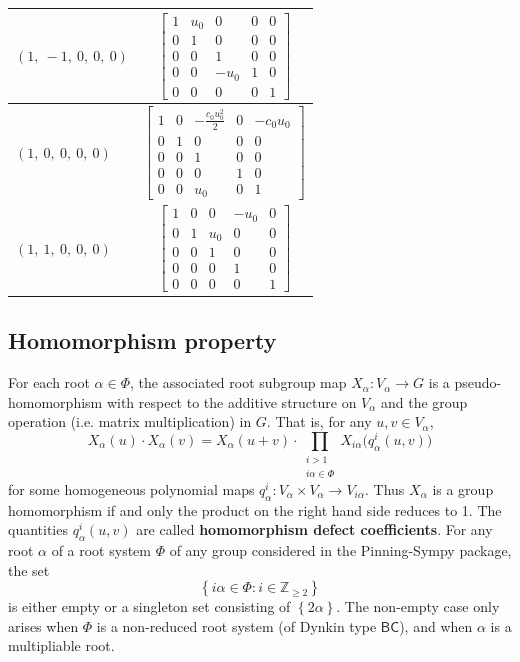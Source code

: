 \documentclass[11pt]{article}
\newcommand{\noi}{\noindent}
\newcommand{\tbf}{\textbf}
\newcommand{\lb}{\left\{}
\newcommand{\rb}{\right\}}
\newcommand{\Z}{\mathbb{Z}}
\theoremstyle{definition}
\begin{document}
\begin{longtable}{|l|c|}
    \hline
    $\left( 1, \  -1, \  0, \  0, \  0\right)$ & ${\left[\begin{matrix}1 & u_{0} & 0 & 0 & 0\\0 & 1 & 0 & 0 & 0\\0 & 0 & 1 & 0 & 0\\0 & 0 & - u_{0} & 1 & 0\\0 & 0 & 0 & 0 & 1\end{matrix}\right]}$ \\
    \hline
    $\left( 1, \  0, \  0, \  0, \  0\right)$ & ${\left[\begin{matrix}1 & 0 & - \frac{c_{0} u_{0}^{2}}{2} & 0 & - c_{0} u_{0}\\0 & 1 & 0 & 0 & 0\\0 & 0 & 1 & 0 & 0\\0 & 0 & 0 & 1 & 0\\0 & 0 & u_{0} & 0 & 1\end{matrix}\right]}$ \\
    \hline
    $\left( 1, \  1, \  0, \  0, \  0\right)$ & ${\left[\begin{matrix}1 & 0 & 0 & - u_{0} & 0\\0 & 1 & u_{0} & 0 & 0\\0 & 0 & 1 & 0 & 0\\0 & 0 & 0 & 1 & 0\\0 & 0 & 0 & 0 & 1\end{matrix}\right]}$ \\
    \hline
\end{longtable}


\subsection{Homomorphism property}

\noi For each root $\alpha \in \Phi$, the associated root subgroup map $X_\alpha:V_\alpha \to G$ is a pseudo-homomorphism with respect to the additive structure on $V_\alpha$ and the group operation (i.e. matrix multiplication) in $G$. That is, for any $u,v \in V_\alpha$,
\begin{equation}
\label{pseudo homomorphism}
	X_\alpha(u) \cdot X_\alpha(v) = X_\alpha(u+v) \cdot \prod_{\substack{i > 1 \\ i \alpha \in \Phi}} X_{i \alpha} \Big( q^i_\alpha(u,v) \Big)
\end{equation}
for some homogeneous polynomial maps $q^i_\alpha:V_\alpha \times V_\alpha \to V_{i \alpha}$. Thus $X_\alpha$ is a group homomorphism if and only the product on the right hand side reduces to 1. The quantities $q^i_\alpha(u,v)$ are called \tbf{homomorphism defect coefficients}. For any root $\alpha$ of a root system $\Phi$ of any group considered in the Pinning-Sympy package, the set
\[
	\lb i \alpha \in \Phi : i \in \Z_{\ge 2} \rb
\]
is either empty or a singleton set consisting of $\lb 2 \alpha \rb$. The non-empty case only arises when $\Phi$ is a non-reduced root system (of Dynkin type $\mathsf{BC}$), and when $\alpha$ is a multipliable root. 
\end{document}
